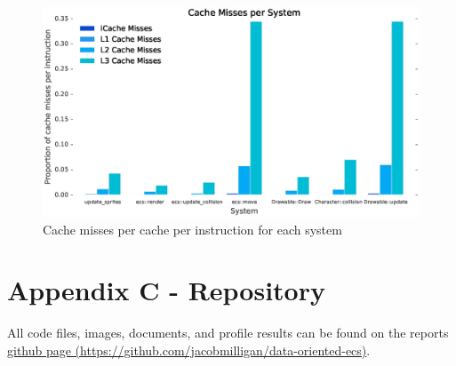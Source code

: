 \documentclass[10pt]{scrartcl}
\begin{document}
\begin{figure}[H]
	\centering
	\includegraphics[width=\textwidth]{profiling/individual.eps}
	\caption{Cache misses per cache per instruction for each system}
	\label{fig:function_misses}
\end{figure}

\section{Appendix C - Repository} %
\label{sec:appendix_c_repository}
All code files, images, documents, and profile results can be found on the reports \href{https://github.com/jacobmilligan/data-oriented-ecs}{github page (https://github.com/jacobmilligan/data-oriented-ecs)}.
\end{document}

